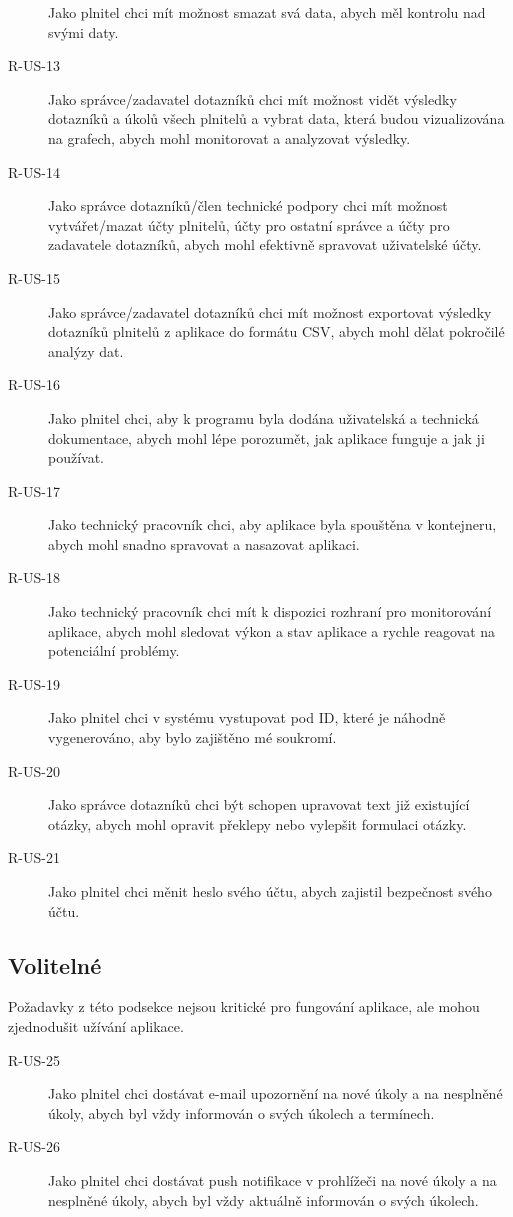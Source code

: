 \begin{description}
    Jako plnitel chci mít možnost smazat svá data, abych měl kontrolu nad svými daty.
    \item[R-US-13]
    Jako správce/zadavatel dotazníků chci mít možnost vidět výsledky dotazníků a úkolů všech plnitelů a vybrat data, která budou vizualizována na grafech, abych mohl monitorovat a analyzovat výsledky.
    \item[R-US-14]
    Jako správce dotazníků/člen technické podpory chci mít možnost vytvářet/mazat účty plnitelů, účty pro ostatní správce a účty pro zadavatele dotazníků, abych mohl efektivně spravovat uživatelské účty.
    \item[R-US-15]
    Jako správce/zadavatel dotazníků chci mít možnost exportovat výsledky dotazníků plnitelů z aplikace do formátu CSV, abych mohl dělat pokročilé analýzy dat.
    \item[R-US-16]
    Jako plnitel chci, aby k programu byla dodána uživatelská a technická dokumentace, abych mohl lépe porozumět, jak aplikace funguje a jak ji používat.
    \item[R-US-17]
    Jako technický pracovník chci, aby aplikace byla spouštěna v kontejneru, abych mohl snadno spravovat a nasazovat aplikaci.
    \item[R-US-18]
    Jako technický pracovník chci mít k dispozici rozhraní pro monitorování aplikace, abych mohl sledovat výkon a stav aplikace a rychle reagovat na potenciální problémy.
    \item[R-US-19]
    Jako plnitel chci v systému vystupovat pod ID, které je náhodně vygenerováno, aby bylo zajištěno mé soukromí.
    \item[R-US-20]
    Jako správce dotazníků chci být schopen upravovat text již existující otázky, abych mohl opravit překlepy nebo vylepšit formulaci otázky.
    \item[R-US-21]
    Jako plnitel chci měnit heslo svého účtu, abych zajistil bezpečnost svého účtu.
\end{description}

\subsection{Volitelné}\label{subsec:volitelne}

Požadavky z této podsekce nejsou kritické pro fungování aplikace, ale mohou zjednodušit užívání aplikace.

\begin{description}
    \item[R-US-25]
    Jako plnitel chci dostávat e-mail upozornění na nové úkoly a na nesplněné úkoly, abych byl vždy informován o svých úkolech a termínech.
    \item[R-US-26]
    Jako plnitel chci dostávat push notifikace v prohlížeči na nové úkoly a na nesplněné úkoly, abych byl vždy aktuálně informován o svých úkolech.
\end{description}


